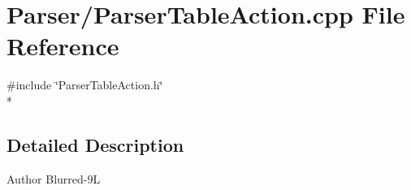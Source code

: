 \section{Parser/\-Parser\-Table\-Action.cpp File Reference}
\label{_parser_table_action_8cpp}
{\ttfamily \#include \char`\"{}Parser\-Table\-Action.\-h\char`\"{}}\\*


\subsection{Detailed Description}
\begin{DoxyAuthor}{Author}
Blurred-\/9\-L 
\end{DoxyAuthor}

